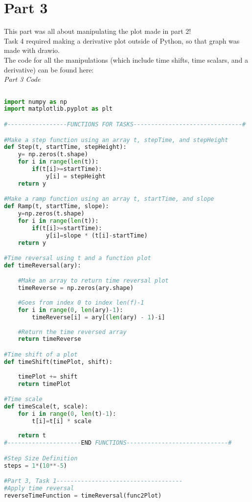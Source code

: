 \documentclass[12pt,a4paper]{article}
\begin{document}
\section{Part 3}\label{sec:intro}
This part was all about manipulating the plot made in part 2!\\
Task 4 required making a derivative plot outside of Python, so that graph was made with drawio.\\
The code for all the manipulations (which include time shifts, time scalars, and a derivative) can be found here:\\
\textit{Part 3 Code}
\begin{lstlisting}[language=Python]
    
import numpy as np
import matplotlib.pyplot as plt

#-----------------FUNCTIONS FOR TASKS-------------------------------#

#Make a step function using an array t, stepTime, and stepHeight
def Step(t, startTime, stepHeight):
    y= np.zeros(t.shape)
    for i in range(len(t)):
        if(t[i]>=startTime):
            y[i] = stepHeight
    return y

#Make a ramp function using an array t, startTime, and slope
def Ramp(t, startTime, slope):
    y=np.zeros(t.shape)
    for i in range(len(t)):
        if(t[i]>=startTime):
            y[i]=slope * (t[i]-startTime)
    return y

#Time reversal using t and a function plot
def timeReversal(ary):

    #Make an array to return time reversal plot
    timeReverse = np.zeros(ary.shape)
    
    #Goes from index 0 to index len(f)-1
    for i in range(0, len(ary)-1):
        timeReverse[i] = ary[(len(ary) - 1)-i]
            
    #Return the time reversed array
    return timeReverse

#Time shift of a plot
def timeShift(timePlot, shift):
    
    timePlot += shift
    return timePlot

#Time scale
def timeScale(t, scale):
    for i in range(0, len(t)-1):
        t[i]=t[i] * scale
        
    return t
#---------------------END FUNCTIONS-----------------------------#

#Step Size Definition
steps = 1*(10**-5)

#Part 3, Task 1------------------------------------
#Apply time reversal
reverseTimeFunction = timeReversal(func2Plot)


\end{lstlisting}
\end{document}
